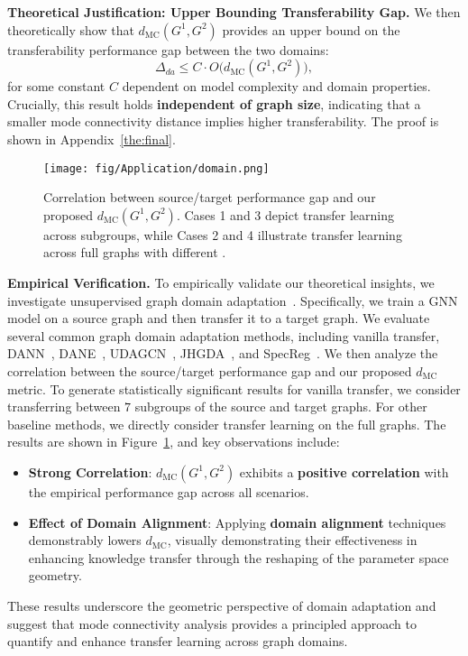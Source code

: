 {\bf Theoretical Justification: Upper Bounding Transferability Gap.}
\label{subsubsec:theory_transfer} We then theoretically show that $d_{\text{MC}}(G^1, G^2)$ provides an {upper bound} on the transferability performance gap between the two domains:
\begin{equation}
    \Delta_{da} \leq C \cdot O\bigg(d_{\text{MC}}(G^1, G^2)\bigg),
\end{equation}
for some constant $C$ dependent on model complexity and domain properties. Crucially, this result holds \textbf{independent of graph size}, indicating that a smaller mode connectivity distance implies {higher transferability}. The proof is shown in Appendix~\ref{the:final}.

\begin{figure}
    \centering
    \texttt{[image: fig/Application/domain.png]}
\caption{Correlation between source/target performance gap and our proposed $d_{\text{MC}}(G^1, G^2)$. Cases 1 and 3 depict transfer learning across subgroups, while Cases 2 and 4 illustrate transfer learning across full graphs with different .}
    \label{fig:domainada}
    \vspace{-0.2in}
\end{figure}

{\bf Empirical Verification.}
\label{subsubsec:empirical_results} To empirically validate our theoretical insights, we investigate unsupervised graph domain adaptation~\citep{wu2020unsupervised}. Specifically, we train a GNN model on a source graph and then transfer it to a target graph. We evaluate several common graph domain adaptation methods, including vanilla transfer, DANN~\citep{ganin2016domain}, DANE~\citep{song2020domain}, UDAGCN~\citep{wu2020unsupervised}, JHGDA~\citep{shi2023improving}, and SpecReg~\citep{you2023graph}. We then analyze the correlation between the source/target performance gap and our proposed $d_{\text{MC}}$ metric. To generate statistically significant results for vanilla transfer, we consider transferring between $7$ subgroups of the source and target graphs. For other baseline methods, we directly consider transfer learning on the full graphs. The results are shown in Figure~\ref{fig:domainada}, and  key observations include:
\begin{itemize}[nosep, leftmargin=20pt]
    \item \textbf{Strong Correlation}: $d_{\text{MC}}(G^1, G^2)$ exhibits a \textbf{positive correlation} with the empirical performance gap across all scenarios. 
    \item \textbf{Effect of Domain Alignment}: Applying \textbf{domain alignment} techniques demonstrably lowers $d_{\text{MC}}$, visually demonstrating their effectiveness in enhancing knowledge transfer through the reshaping of the parameter space geometry.
\end{itemize}

These results underscore the {geometric perspective} of domain adaptation and suggest that {mode connectivity analysis} provides a principled approach to quantify and enhance {transfer learning across graph domains}.
